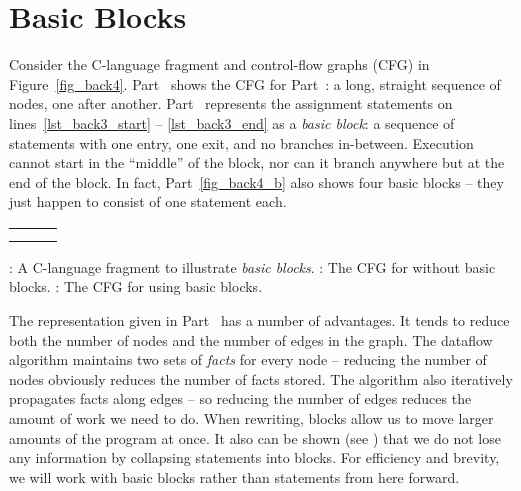 \documentclass[12pt]{report}
\begin{document}
\section{Basic Blocks}
\label{sec_back3}


Consider the C-language fragment and control-flow graphs (CFG) in
Figure~\ref{fig_back4}.  Part~ shows the CFG for
Part~: a long, straight sequence of nodes, one
after another. Part~ represents the assignment statements on
lines~\ref{lst_back3_start} -- \ref{lst_back3_end} as a \emph{basic
  block}: a sequence of statements with one entry, one exit, and no
branches in-between. Execution cannot start in the ``middle'' of the
block, nor can it branch anywhere but at the end of the block. In fact,
Part~\ref{fig_back4_b} also shows four basic blocks -- they just happen
to consist of one statement each.

\begin{myfig}
\begin{tabular}{m{1.5in}m{1.5in}m{1.5in}}
  \begin{center}
    \subfloat{\label{fig_back4_a}}
  \end{center} & %
  \begin{center}
    \subfloat{\label{fig_back4_b}}
  \end{center}
  & %
  \begin{center}
    \subfloat{\label{fig_back4_c}}
  \end{center} \\
  \vtop{\centering\subref{fig_back4_a}} & \vtop{\centering\subref{fig_back4_b}} & \vtop{\centering\subref{fig_back4_c}} \\
\end{tabular}
\caption{: A C-language fragment to illustrate
  \emph{basic blocks}.  : The CFG for
   without basic blocks. : The
  CFG for  using basic blocks.}
\label{fig_back4}
\end{myfig}

The representation given in Part~ has a number of
advantages. It tends to reduce both the number of nodes and the number
of edges in the graph. The dataflow algorithm maintains two sets of
\emph{facts} for every node -- reducing the number of nodes obviously
reduces the number of facts stored. The algorithm also iteratively
propagates facts along edges -- so reducing the number of edges
reduces the amount of work we need to do. When rewriting, blocks allow
us to move larger amounts of the program at once. It also can be shown
(see \citep{Aho2006}) that we do not lose any information by collapsing
statements into blocks. For efficiency and brevity, we will work with
basic blocks rather than statements from here forward.
\end{document}
